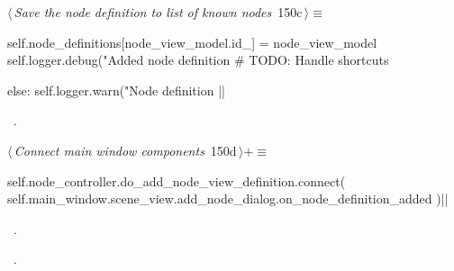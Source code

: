 \documentclass[%
    a4paper,    %
    justified,  %
    nobib,      %
    openany     %
]{tufte-book}
\begin{document}
%
\begin{flushleft} \small
\begin{minipage}{\linewidth}\label{scrap164}\raggedright\small
{} $\langle\,${\itshape Save the node definition to list of known nodes}\nobreak\ {\footnotesize {150c}}$\,\rangle\equiv$
\vspace{-1ex}
\begin{pythoncode}
    self.node_definitions[node_view_model.id_] = node_view_model
    self.logger.debug("Added node definition %
    # TODO: Handle shortcuts

else:
    self.logger.warn("Node definition %
|\NWsep|
\end{pythoncode}
\vspace{1.5ex}
\footnotesize
\begin{list}{}{\setlength{\itemsep}{-\parsep}\setlength{\itemindent}{-\leftmargin}}
\item \NWtxtMacroRefIn\ .

\item{}
\end{list}
\end{minipage}\vspace{4ex}
\end{flushleft}
%
\begin{flushleft} \small
\begin{minipage}{\linewidth}\label{scrap165}\raggedright\small
{} $\langle\,${\itshape Connect main window components}\nobreak\ {\footnotesize {150d}}$\,\rangle+\equiv$
\vspace{-1ex}
\begin{pythoncode}
self.node_controller.do_add_node_view_definition.connect(
    self.main_window.scene_view.add_node_dialog.on_node_definition_added
    )|\NWsep|
\end{pythoncode}
\vspace{1.5ex}
\footnotesize
\begin{list}{}{\setlength{\itemsep}{-\parsep}\setlength{\itemindent}{-\leftmargin}}
\item \NWtxtMacroDefBy\ .
\item \NWtxtMacroRefIn\ .

\item{}
\end{list}
\end{minipage}\vspace{4ex}
\end{flushleft}
\end{document}

